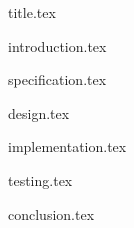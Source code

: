 \documentclass[a4paper,12pt]{article}
\begin{document}
{title.tex}

\newpage

\newpage
\vfill
\tableofcontents
\vfill
\newpage
\listoffigures

\newpage
{}

{introduction.tex}

{specification.tex}

{design.tex}

{implementation.tex}

{testing.tex}

{conclusion.tex}
\end{document}
